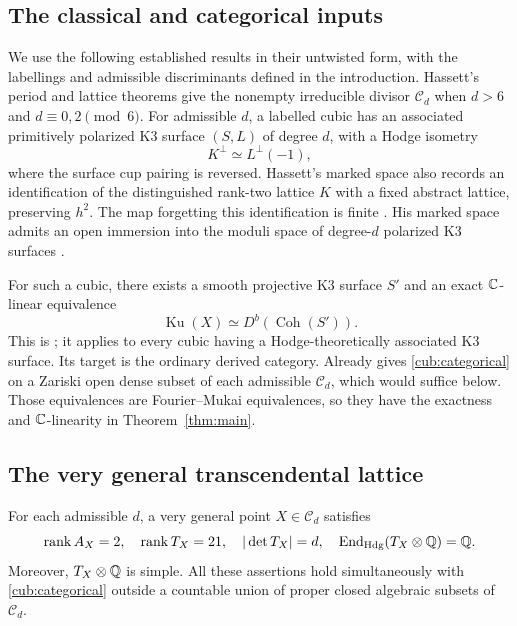 \subsection{The classical and categorical inputs}

We use the following established results in their untwisted form, with
the labellings and admissible discriminants defined in the introduction.
Hassett's period and lattice theorems
\cite[Theorems~1.0.1, 1.0.2 and 5.1.3; Corollary~5.2.4]{Hassett00}
give the nonempty irreducible divisor $\mathcal C_d$ when
$d>6$ and $d\equiv0,2\pmod6$.  For admissible $d$, a labelled cubic has
an associated primitively polarized K3 surface $(S,L)$ of degree $d$,
with a Hodge isometry
\begin{equation}
 \label{cub:associated}
 K^\perp \simeq L^\perp(-1),
\end{equation}
where the surface cup pairing is reversed. Hassett's marked space also
records an identification of the distinguished rank-two lattice $K$
with a fixed abstract lattice, preserving $h^2$. The map forgetting
this identification is finite \cite[Section~5.2 and
Proposition~5.2.1]{Hassett00}. His marked space admits an open immersion
into the moduli space of degree-$d$ polarized K3 surfaces
\cite[Corollary~5.2.4]{Hassett00}.

For such a cubic, there exists a smooth projective K3 surface $S'$ and
an exact $\mathbb C$-linear equivalence
\begin{equation}
 \label{cub:categorical}
 \operatorname{Ku}(X)\simeq D^b(\operatorname{Coh}(S')).
\end{equation}
This is \cite[Corollary~29.7]{BLMPNS21}; it applies to every cubic having
a Hodge-theoretically associated K3 surface.  Its target is the ordinary
derived category.  Already
\cite[Theorem~1.1]{AddingtonThomas14} gives \eqref{cub:categorical} on a
Zariski open dense subset of each admissible $\mathcal C_d$, which would
suffice below.  Those equivalences are Fourier--Mukai equivalences, so
they have the exactness and $\mathbb C$-linearity in Theorem~\ref{thm:main}.

\subsection{The very general transcendental lattice}

\begin{lemma}
\label{cub:generic}
For each admissible $d$, a very general point $X\in\mathcal C_d$
satisfies
\begin{equation}
 \label{cub:generic-data}
 \operatorname{rank}A_X=2,\quad
 \operatorname{rank}T_X=21,\quad
 |\det T_X|=d,\quad
 \operatorname{End}_{\mathrm{Hdg}}(T_X\otimes\mathbb Q)=\mathbb Q.
\end{equation}
Moreover, $T_X\otimes\mathbb Q$ is simple.  All these assertions hold
simultaneously with \eqref{cub:categorical} outside a countable union
of proper closed algebraic subsets of $\mathcal C_d$.
\end{lemma}

